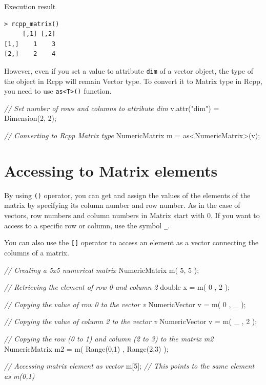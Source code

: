 \documentclass[]{book}
\newenvironment{Shaded}{\begin{snugshade}}{\end{snugshade}}
\newcommand{\DataTypeTok}[1]{\textcolor[rgb]{0.13,0.29,0.53}{#1}}
\newcommand{\DecValTok}[1]{\textcolor[rgb]{0.00,0.00,0.81}{#1}}
\newcommand{\StringTok}[1]{\textcolor[rgb]{0.31,0.60,0.02}{#1}}
\newcommand{\CommentTok}[1]{\textcolor[rgb]{0.56,0.35,0.01}{\textit{#1}}}
\newcommand{\NormalTok}[1]{#1}
\theoremstyle{definition}
\theoremstyle{definition}
\theoremstyle{remark}
\begin{document}
Execution result

\begin{verbatim}
> rcpp_matrix()
     [,1] [,2]
[1,]    1    3
[2,]    2    4
\end{verbatim}

However, even if you set a value to attribute \texttt{dim} of a vector
object, the type of the object in Rcpp will remain Vector type. To
convert it to Matrix type in Rcpp, you need to use
\texttt{as\textless{}T\textgreater{}()} function.

\begin{Shaded}
\begin{Highlighting}[]
\CommentTok{// Set number of rows and columns to attribute dim}
\NormalTok{v.attr(}\StringTok{"dim"}\NormalTok{) = Dimension(}\DecValTok{2}\NormalTok{, }\DecValTok{2}\NormalTok{);}

\CommentTok{// Converting to Rcpp Matrix type}
\NormalTok{NumericMatrix m = as<NumericMatrix>(v);}
\end{Highlighting}
\end{Shaded}

\section{Accessing to Matrix
elements}\label{accessing-to-matrix-elements}

By using \texttt{()} operator, you can get and assign the values of the
elements of the matrix by specifying its column number and row number.
As in the case of vectors, row numbers and column numbers in Matrix
start with 0. If you want to access to a specific row or column, use the
symbol \texttt{\_}.

You can also use the \texttt{{[}{]}} operator to access an element as a
vector connecting the columns of a matrix.

\begin{Shaded}
\begin{Highlighting}[]
\CommentTok{// Creating a 5x5 numerical matrix}
\NormalTok{NumericMatrix m( }\DecValTok{5}\NormalTok{, }\DecValTok{5}\NormalTok{ );}

\CommentTok{// Retrieving the element of row 0 and column 2}
\DataTypeTok{double}\NormalTok{ x = m( }\DecValTok{0}\NormalTok{ , }\DecValTok{2}\NormalTok{ );}

\CommentTok{// Copying the value of row 0 to the vector v}
\NormalTok{NumericVector v = m( }\DecValTok{0}\NormalTok{ , _ );}

\CommentTok{// Copying the value of column 2 to the vector v}
\NormalTok{NumericVector v = m( _ , }\DecValTok{2}\NormalTok{ );}

\CommentTok{// Copying the row (0 to 1) and column (2 to 3) to the matrix m2}
\NormalTok{NumericMatrix m2 = m( Range(}\DecValTok{0}\NormalTok{,}\DecValTok{1}\NormalTok{) , Range(}\DecValTok{2}\NormalTok{,}\DecValTok{3}\NormalTok{) );}

\CommentTok{// Accessing matrix element as vector}
\NormalTok{m[}\DecValTok{5}\NormalTok{]; }\CommentTok{// This points to the same element as m(0,1)}
\end{Highlighting}
\end{Shaded}
\end{document}
